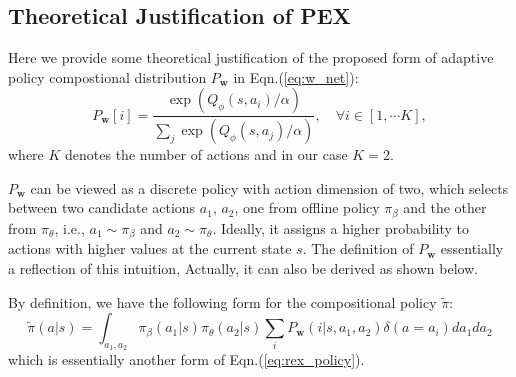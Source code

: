 \documentclass{article}
\newcommand{\w}{{\mathbf{w}}}
\begin{document}
\subsection{Theoretical Justification of PEX}
Here we provide some theoretical justification of the proposed form of adaptive policy compostional distribution $P_{\mathbf{w}}$ in Eqn.(\ref{eq:w_net}):
\begin{equation}
	P_{\w}[i] = \frac{\exp (Q_{\phi}(s, a_i)/\alpha)}{\sum_j \exp (Q_{\phi}(s, a_j)/\alpha)}, \quad \forall i \in [1, \cdots K],
\end{equation}
where $K$ denotes the number of actions and in our case $K=2$.

$P_{\mathbf{w}}$ can be viewed as a discrete policy with action dimension of two, which selects between two candidate actions $a_1$, $a_2$, one from offline policy $\pi_{\beta}$ and the other from $\pi_{\theta}$, i.e., $a_1 \sim \pi_{\beta}$ and $a_2\sim\pi_{\theta}$.
Ideally, it assigns a higher probability to actions with higher values at the current state $s$.
The definition of $P_{\w}$ essentially a reflection of this intuition, Actually, it can also be derived as shown below.

By definition, we have the following form for the compositional policy $\tilde{\pi}$:
\begin{equation} \label{eq:policy_def}
	{\tilde{\pi}(a|s)} = \int_{a_1,a_2}\pi_{\beta}(a_1|s)\pi_{\theta}(a_2|s)\sum_i P_{\mathbf{w}}(i|s,a_1,a_2)\delta(a=a_i)da_1da_2
\end{equation}
which is essentially another form of Eqn.(\ref{eq:rex_policy}).
\end{document}
